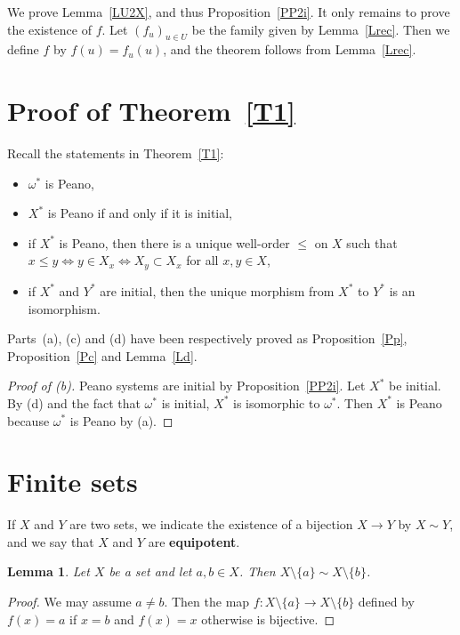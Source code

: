 \documentclass[12pt,letterpaper]{article}
\newtheorem{lem}[thm]{Lemma} %
\begin{document}
We prove Lemma~\ref{LU2X}, and thus Proposition~\ref{PP2i}. It only remains to prove the existence of \(f\). Let \((f_u)_{u\in U}\) be the family given by Lemma~\ref{Lrec}. Then we define \(f\) by \(f(u)=f_u(u)\), and the theorem follows from Lemma~\ref{Lrec}. 

\section{Proof of Theorem~\ref{T1}} %

Recall the statements in Theorem~\ref{T1}: 

\begin{itemize}
\item[(a)] \(\omega^*\) is Peano, 
\item[(b)] \(X^*\) is Peano if and only if it is initial, 
\item[(c)] if \(X^*\) is Peano, then there is a unique well-order \(\le\) on \(X\) such that \(x\le y\Leftrightarrow y\in X_x\Leftrightarrow X_y\subset X_x\) for all \(x,y\in X\),
\item[(d)] if \(X^*\) and \(Y^*\) are initial, then the unique morphism from \(X^*\) to \(Y^*\) is an isomorphism.   
\end{itemize} 

Parts~(a), (c) and (d) have been respectively proved as Proposition~\ref{Pp}, Proposition~\ref{Pc} and Lemma~\ref{Ld}.  

\begin{proof}[Proof of \emph{(b)}]  
Peano systems are initial by Proposition~\ref{PP2i}. Let \(X^*\) be initial. By (d) and the fact that \(\omega^*\) is initial, \(X^*\) is isomorphic to \(\omega^*\). Then \(X^*\) is Peano because \(\omega^*\) is Peano by (a). 
\end{proof} 

\section{Finite sets} %

If \(X\) and \(Y\) are two sets, we indicate the existence of a bijection \(X\to Y\) by \(X\sim Y\), and we say that \(X\) and \(Y\) are \textbf{equipotent}. 

\begin{lem}\label{LabX} 
Let \(X\) be a set and let \(a,b\in X\). Then \(X\setminus\{a\}\sim X\setminus\{b\}\).
\end{lem} 
\begin{proof} 
We may assume \(a\ne b\). Then the map \(f:X\setminus\{a\}\to X\setminus\{b\}\) defined by \(f(x)=a\) if \(x=b\) and \(f(x)=x\) otherwise is bijective. 
\end{proof} 
\end{document}
